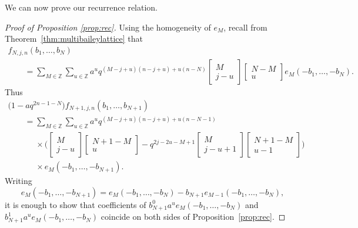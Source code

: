 \documentclass[pdftex]{sigma}
\numberwithin{equation}{section}
\newcommand{\field}[1]{\mathbb{#1}}
\newcommand{\Z}{\field{Z}}
\begin{document}
We can now prove our recurrence relation.
\begin{proof}[Proof of Proposition \ref{prop:rec}]
Using the homogeneity of $e_M$, recall from Theorem~\ref{thm:multibaileylattice} that
\begin{gather*}
f_{N,j,n}(b_1,\ldots,b_N)\\
\qquad= \sum_{M \in \Z} \sum_{u \in \Z} a^{u}q^{(M-j+u)(n-j+u)+u(n-N)} \begin{bmatrix}
M\\
j-u
\end{bmatrix} \begin{bmatrix}
N-M\\
u
\end{bmatrix} e_M(-b_1, \dots , -b_N).
\end{gather*}
Thus
\begin{gather}
\bigl(1-aq^{2n-1-N}\bigr)f_{N+1,j,n}(b_1,\ldots,b_{N+1})\nonumber \\
\qquad= \sum_{M \in \Z} \sum_{u\in \mathbb{Z}} a^{u}q^{(M-j+u)(n-j+u)+u(n-N-1)}\nonumber\\
\phantom{\qquad=}{}\times\bigg( \begin{bmatrix}
M\\
j-u
\end{bmatrix} \begin{bmatrix}
N+1-M\\
u
\end{bmatrix}
-q^{2j-2u-M+1}\begin{bmatrix}
M\\
j-u+1
\end{bmatrix} \begin{bmatrix}
N+1-M\\
u-1
\end{bmatrix} \bigg)\nonumber\\
\phantom{\qquad=}{}\times e_M(-b_1, \dots , -b_{N+1}).\label{eq:lastline}
\end{gather}
Writing
\begin{equation*}e_M(-b_1, \dots , -b_{N+1})=e_M(-b_1, \dots , -b_{N})-b_{N+1}e_{M-1}(-b_1, \dots , -b_{N}),
\end{equation*}
it is enough to show that coefficients of $b_{N+1}^0a^ue_M(-b_1, \dots , -b_{N})$ and $b_{N+1}^1a^ue_M(-b_1, \dots , -b_{N})$ coincide on both sides of Proposition~\ref{prop:rec}.


\end{proof}
\end{document}
